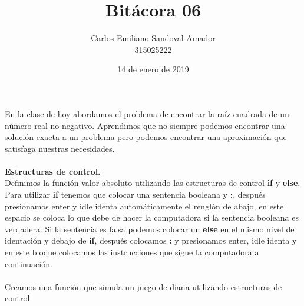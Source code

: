 \documentclass[letterpaper, 12pt, oneside]{article}%
\title{Bitácora 06}
\author{Carlos Emiliano Sandoval Amador \\ 315025222}
\date{14 de enero de 2019}
\begin{document}
	\maketitle
	En la clase de hoy abordamos el problema de encontrar la raíz cuadrada de un número real no negativo. Aprendimos que no siempre podemos encontrar una solución exacta a un problema pero podemos encontrar una aproximación que satisfaga nuestras necesidades. \\
	\\ %
	 \textbf{Estructuras de control.} \\ Definimos la función valor absoluto utilizando las estructuras de control \textbf{if} y \textbf{else}. Para utilizar \textbf{if} tenemos que colocar una sentencia booleana y \textbf{:}, después presionamos enter y idle identa automáticamente el renglón de abajo, en este espacio se coloca lo que debe de hacer la computadora si la sentencia booleana es verdadera. Si la sentencia es falsa podemos colocar un \textbf{else} en el mismo nivel de identación y debajo de \textbf{if}, después colocamos \textbf{:} y presionamos enter, idle identa y en este bloque colocamos las instrucciones que sigue la computadora a continuación. \\ \\ 
	 
	 Creamos una función que simula un juego de diana utilizando estructuras de control.
\end{document}
